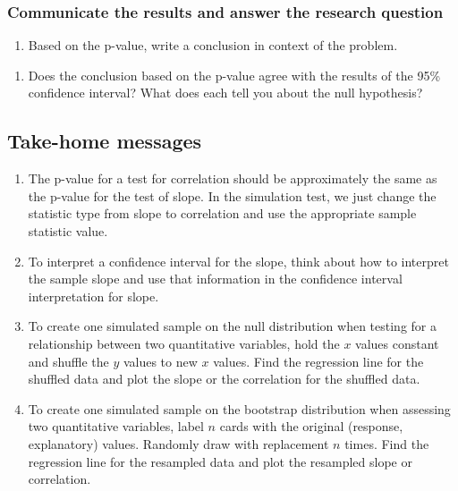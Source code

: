 \documentclass[
]{report}
\providecommand{\tightlist}{%
  \setlength{\itemsep}{0pt}\setlength{\parskip}{0pt}}
\begin{document}
\vspace{0.8in}

\hypertarget{communicate-the-results-and-answer-the-research-question-4}{%
\subsubsection*{Communicate the results and answer the research question}\label{communicate-the-results-and-answer-the-research-question-4}}

\begin{enumerate}
\def\labelenumi{\arabic{enumi}.}
\setcounter{enumi}{13}
\tightlist
\item
  Based on the p-value, write a conclusion in context of the problem.
\end{enumerate}

\vspace{.8in}

\begin{enumerate}
\def\labelenumi{\arabic{enumi}.}
\setcounter{enumi}{14}
\tightlist
\item
  Does the conclusion based on the p-value agree with the results of the 95\% confidence interval? What does each tell you about the null hypothesis?
\end{enumerate}

\vspace{.6in}
\newpage

\hypertarget{take-home-messages-6}{%
\subsection{Take-home messages}\label{take-home-messages-6}}

\begin{enumerate}
\def\labelenumi{\arabic{enumi}.}
\item
  The p-value for a test for correlation should be approximately the same as the p-value for the test of slope. In the simulation test, we just change the statistic type from slope to correlation and use the appropriate sample statistic value.
\item
  To interpret a confidence interval for the slope, think about how to interpret the sample slope and use that information in the confidence interval interpretation for slope.
\item
  To create one simulated sample on the null distribution when testing for a relationship between two quantitative variables, hold the \(x\) values constant and shuffle the \(y\) values to new \(x\) values. Find the regression line for the shuffled data and plot the slope or the correlation for the shuffled data.
\item
  To create one simulated sample on the bootstrap distribution when assessing two quantitative variables, label \(n\) cards with the original (response, explanatory) values. Randomly draw with replacement \(n\) times. Find the regression line for the resampled data and plot the resampled slope or correlation.
\end{enumerate}
\end{document}
